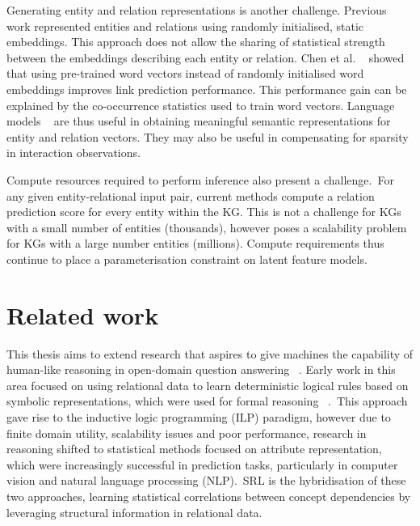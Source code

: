 \noindent Generating entity and relation representations is another challenge. Previous work represented entities and relations using randomly initialised, static embeddings. This approach does not allow the sharing of statistical strength between the embeddings describing each entity or relation. Chen et al. \unskip~\citep{socher2013reasoning} showed that using pre-trained word vectors instead of randomly initialised word embeddings improves link prediction performance. This performance gain can be explained by the co-occurrence statistics used to train word vectors. Language models \unskip~\citep{ bojanowski2016enriching, vaswani2017attention} are thus useful in obtaining meaningful semantic representations for entity and relation vectors. They may also be useful in compensating for sparsity in interaction observations. \par

\noindent Compute resources required to perform inference also present a challenge.\ For any given entity-relational input pair, current methods compute a relation prediction score for every entity within the KG. This is not a challenge for KGs with a small number of entities (thousands), however poses a scalability problem for KGs with a large number entities (millions). Compute requirements thus continue to place a parameterisation constraint on latent feature models. 



\section{Related work} %

\noindent This thesis aims to extend research that aspires to give machines the capability of human-like reasoning in open-domain question answering \unskip~\citep{hakimov2019evaluating}. Early work in this area focused on using relational data to learn deterministic logical rules based on symbolic representations, which were used for formal reasoning \unskip~\citep{hohenecker2017deep}.\ This approach gave rise to the inductive logic programming (ILP) paradigm, however due to finite domain utility, scalability issues and poor performance, research in reasoning shifted to statistical methods focused on attribute representation, which were increasingly successful in prediction tasks, particularly in computer vision and natural language processing (NLP).\ SRL is the hybridisation of these two approaches, learning statistical correlations between concept dependencies by leveraging structural information in relational data. \par

